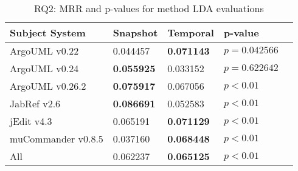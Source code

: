 
\begin{table}[t]
\renewcommand{\arraystretch}{1.3}
\footnotesize
\centering
\caption{RQ2: MRR and p-values for method LDA evaluations}
\begin{tabular}{l|ll|ll}
   \toprule
    Subject System & Snapshot & Temporal & p-value  \\
    \midrule

ArgoUML v0.22 & 0.044457 & {\bf 0.071143 } & $p = 0.042566$ \\
ArgoUML v0.24 & {\bf 0.055925 } & 0.033152 & $p = 0.622642$ \\
ArgoUML v0.26.2 & {\bf 0.075917 } & 0.067056 & $p < 0.01$ \\
JabRef v2.6 & {\bf 0.086691 } & 0.052583 & $p < 0.01$ \\
jEdit v4.3 & 0.065191 & {\bf 0.071129 } & $p < 0.01$ \\
muCommander v0.8.5 & 0.037160 & {\bf 0.068448 } & $p < 0.01$ \\
\midrule
All & 0.062237 & {\bf 0.065125 } & $p < 0.01$ \\

    \bottomrule
\end{tabular}
\label{table:rq2:method:lda}
\end{table}


